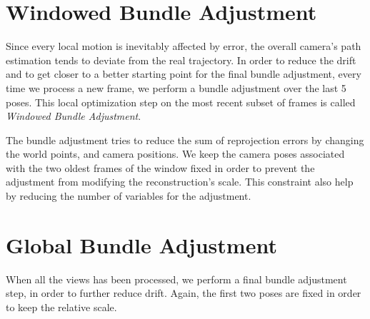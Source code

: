 \section{Windowed Bundle Adjustment}
Since every local motion is inevitably affected by error, the overall 
camera's path estimation tends to deviate from the real trajectory.
In order to reduce the drift and to get closer to a better starting point 
for the final bundle adjustment, every time we process a new frame, 
we perform a bundle adjustment over the last 5 poses.
This local optimization step on the most recent subset of frames is called
\textit{Windowed Bundle Adjustment}.

The bundle adjustment tries to reduce the sum of reprojection errors by changing the
world points, and camera positions. 
We keep the camera poses associated with the two oldest frames of the window 
fixed in order to prevent the adjustment from modifying the reconstruction's 
scale. This constraint also help by reducing the number of variables for the 
adjustment.

\section{Global Bundle Adjustment}
When all the views has been processed, we perform a final bundle adjustment 
step, in order to further reduce drift. Again, the first two poses are fixed in 
order to keep the relative scale.
